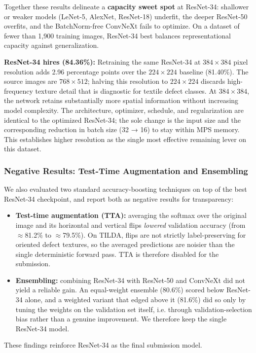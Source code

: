 \documentclass{name}
\begin{document}
Together these results delineate a \textbf{capacity sweet spot} at ResNet-34: shallower or weaker models (LeNet-5, AlexNet, ResNet-18) underfit, the deeper ResNet-50 overfits, and the BatchNorm-free ConvNeXt fails to optimize. On a dataset of fewer than 1,900 training images, ResNet-34 best balances representational capacity against generalization.

    \textbf{ResNet-34 hires (84.36\%):} Retraining the same ResNet-34 at $384\times384$ pixel resolution adds 2.96 percentage points over the $224\times224$ baseline (81.40\%). The source images are $768\times512$; halving this resolution to $224\times224$ discards high-frequency texture detail that is diagnostic for textile defect classes. At $384\times384$, the network retains substantially more spatial information without increasing model complexity. The architecture, optimizer, schedule, and regularization are identical to the optimized ResNet-34; the sole change is the input size and the corresponding reduction in batch size (32 → 16) to stay within MPS memory. This establishes higher resolution as the single most effective remaining lever on this dataset.

\subsubsection{Negative Results: Test-Time Augmentation and Ensembling}
\label{sec:negative}
We also evaluated two standard accuracy-boosting techniques on top of the best ResNet-34 checkpoint, and report both as negative results for transparency:
\begin{itemize}
    \item \textbf{Test-time augmentation (TTA):} averaging the softmax over the original image and its horizontal and vertical flips \emph{lowered} validation accuracy (from $\approx$81.2\% to $\approx$79.5\%). On TILDA, flips are not strictly label-preserving for oriented defect textures, so the averaged predictions are noisier than the single deterministic forward pass. TTA is therefore disabled for the submission.
    \item \textbf{Ensembling:} combining ResNet-34 with ResNet-50 and ConvNeXt did not yield a reliable gain. An equal-weight ensemble (80.6\%) scored below ResNet-34 alone, and a weighted variant that edged above it (81.6\%) did so only by tuning the weights on the validation set itself, i.e. through validation-selection bias rather than a genuine improvement. We therefore keep the single ResNet-34 model.
\end{itemize}
These findings reinforce ResNet-34 as the final submission model.
\end{document}

